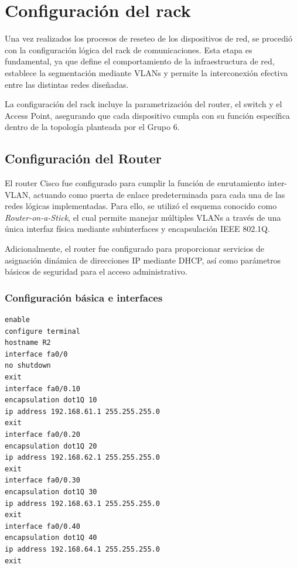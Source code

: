 \section{Configuración del rack}

Una vez realizados los procesos de reseteo de los dispositivos de red, se procedió con la configuración lógica del rack de comunicaciones. Esta etapa es fundamental, ya que define el comportamiento de la infraestructura de red, establece la segmentación mediante VLANs y permite la interconexión efectiva entre las distintas redes diseñadas.

La configuración del rack incluye la parametrización del router, el switch y el Access Point, asegurando que cada dispositivo cumpla con su función específica dentro de la topología planteada por el Grupo 6.

\subsection{Configuración del Router}

El router Cisco fue configurado para cumplir la función de enrutamiento inter-VLAN, actuando como puerta de enlace predeterminada para cada una de las redes lógicas implementadas. Para ello, se utilizó el esquema conocido como \textit{Router-on-a-Stick}, el cual permite manejar múltiples VLANs a través de una única interfaz física mediante subinterfaces y encapsulación IEEE 802.1Q.

Adicionalmente, el router fue configurado para proporcionar servicios de asignación dinámica de direcciones IP mediante DHCP, así como parámetros básicos de seguridad para el acceso administrativo.

\subsubsection{Configuración básica e interfaces}

\begin{lstlisting}[caption={Configuración de subinterfaces y direccionamiento IP en el Router}]
enable
configure terminal
hostname R2
interface fa0/0
no shutdown
exit
interface fa0/0.10
encapsulation dot1Q 10
ip address 192.168.61.1 255.255.255.0
exit
interface fa0/0.20
encapsulation dot1Q 20
ip address 192.168.62.1 255.255.255.0
exit
interface fa0/0.30
encapsulation dot1Q 30
ip address 192.168.63.1 255.255.255.0
exit
interface fa0/0.40
encapsulation dot1Q 40
ip address 192.168.64.1 255.255.255.0
exit
\end{lstlisting}

